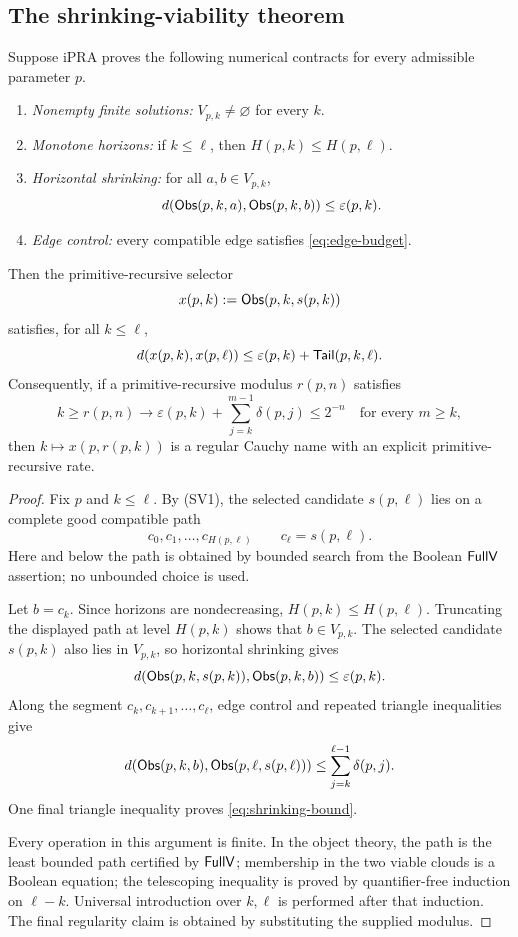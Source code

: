 \subsection{The shrinking-viability theorem}

\begin{theorem}
\label{thm:shrinking-viability}
Suppose iPRA proves the following numerical contracts for every admissible
parameter \(p\).

\begin{enumerate}[label=(SV\arabic*)]
\item \emph{Nonempty finite solutions:}
      \(V_{p,k}\ne\varnothing\) for every \(k\).
\item \emph{Monotone horizons:}
      if \(k\le\ell\), then \(H(p,k)\le H(p,\ell)\).
\item \emph{Horizontal shrinking:} for all \(a,b\in V_{p,k}\),
      \[
       d(\mathsf{Obs}(p,k,a),\mathsf{Obs}(p,k,b))\le\varepsilon(p,k).
      \]
\item \emph{Edge control:} every compatible edge satisfies
      \eqref{eq:edge-budget}.
\end{enumerate}
Then the primitive-recursive selector
\[
 x(p,k):=\mathsf{Obs}(p,k,s(p,k))
\]
satisfies, for all \(k\le\ell\),
\begin{equation}
 d(x(p,k),x(p,\ell))
 \le \varepsilon(p,k)+\mathsf{Tail}(p,k,\ell).
 \label{eq:shrinking-bound}
\end{equation}
Consequently, if a primitive-recursive modulus \(r(p,n)\) satisfies
\[
 k\ge r(p,n)\to
 \varepsilon(p,k)+\sum_{j=k}^{m-1}\delta(p,j)\le 2^{-n}
 \quad\text{for every }m\ge k,
\]
then \(k\mapsto x(p,r(p,k))\) is a regular Cauchy name with an explicit
primitive-recursive rate.
\end{theorem}

\begin{proof}
Fix \(p\) and \(k\le\ell\).  By (SV1), the selected candidate
\(s(p,\ell)\) lies on a complete good compatible path
\[
 c_0,c_1,\ldots,c_{H(p,\ell)}
 \qquad c_\ell=s(p,\ell).
\]
Here and below the path is obtained by bounded search from the Boolean
\(\mathsf{FullV}\) assertion; no unbounded choice is used.

Let \(b=c_k\).  Since horizons are nondecreasing,
\(H(p,k)\le H(p,\ell)\).  Truncating the displayed path at level \(H(p,k)\)
shows that \(b\in V_{p,k}\).  The selected candidate \(s(p,k)\) also lies in
\(V_{p,k}\), so horizontal shrinking gives
\[
 d(\mathsf{Obs}(p,k,s(p,k)),\mathsf{Obs}(p,k,b))\le\varepsilon(p,k).
\]
Along the segment \(c_k,c_{k+1},\ldots,c_\ell\), edge control and repeated
triangle inequalities give
\[
 d(\mathsf{Obs}(p,k,b),\mathsf{Obs}(p,\ell,s(p,\ell)))
 \le \sum_{j=k}^{\ell-1}\delta(p,j).
\]
One final triangle inequality proves \eqref{eq:shrinking-bound}.

Every operation in this argument is finite.  In the object theory, the path
is the least bounded path certified by \(\mathsf{FullV}\); membership in the two
viable clouds is a Boolean equation; the telescoping inequality is proved by
quantifier-free induction on \(\ell-k\).  Universal introduction over
\(k,\ell\) is performed after that induction.  The final regularity claim is
obtained by substituting the supplied modulus.
\end{proof}

